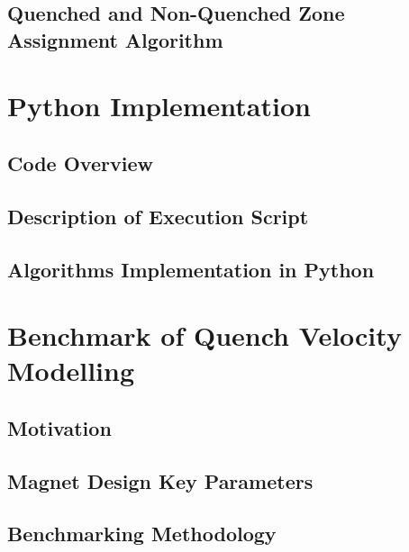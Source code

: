 \documentclass[11pt,a4paper]{report}
\begin{document}
\section{Quenched and Non-Quenched Zone Assignment Algorithm}
\label{section:node_searching_algorithm}


\clearpage
\chapter{Python Implementation}
\label{chapter:python_implementation}

\section{Code Overview}
\label{section:code_overview}


\section{Description of Execution Script}


\section{Algorithms Implementation in Python}
\label{section:description_main_classes}


\clearpage
\chapter{Benchmark of Quench Velocity Modelling}
\label{chapter:quench_velocity_benchmarking}

\section{Motivation}


\section{Magnet Design Key Parameters}


\section{Benchmarking Methodology}
\label{section:quench_velocity_benchmarking_benchmarking_methodology}

\end{document}
